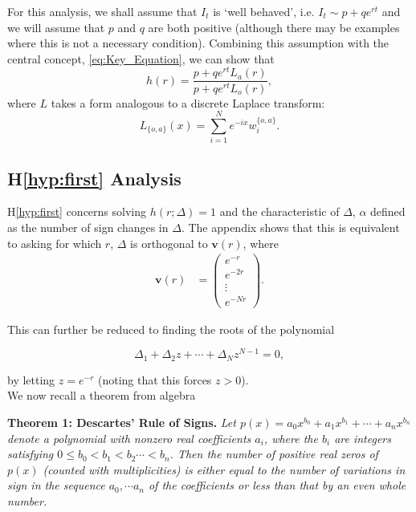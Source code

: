 \documentclass[10pt,journal,compsoc]{IEEEtran}
\begin{document}
For this analysis, we shall assume that $I_t$ is `well behaved', i.e. $I_t \sim p+qe^{rt}$ and we will assume that $p$ and $q$ are both positive (although there may be examples where this is not a necessary condition). Combining this assumption with the central concept, \ref{eq:Key_Equation}, we can show that
\begin{equation}\label{eq:Analysis_centre}
    h(r) = \frac{p+qe^{rt}L_a(r)}{p+qe^{rt}L_o(r)},
\end{equation}
where $L$ takes a form analogous to a discrete Laplace transform:
\begin{equation}
L_{\{o, a\}}(x) = \sum_{i=1}^{N}e^{-ix}w_i^{\{o, a\}}.
\end{equation}

\subsection{H\ref{hyp:first} Analysis}

H\ref{hyp:first} concerns solving $h(r; \Delta) = 1$ and the characteristic of $\Delta$, $\alpha$ defined as the number of sign changes in $\Delta$. The appendix shows that this is equivalent to asking for which $r$, $\Delta$ is orthogonal to $\boldsymbol{v}(r)$, where 
\begin{align*}
    \boldsymbol{v}(r) &= \begin{pmatrix}
           e^{-r} \\
           e^{-2r} \\
           \vdots \\
           e^{-Nr}
         \end{pmatrix}.
  \end{align*}

This can further be reduced to finding the roots of the polynomial

\begin{equation}\label{eq:Poly}
    \Delta_1 +\Delta_2 z + \cdots +\Delta_{N}z^{N-1} = 0,
\end{equation}

by letting $z = e^{-r}$ (noting that this forces $z>0$).\\

We now recall a theorem from algebra

\begin{mdframed}\label{Thm:1}
\textbf{Theorem 1: Descartes' Rule of Signs. }\textit{Let $p(x) = a_0x^{b_0} + a_1 x^{b_1}+ \cdots + a_nx^{b_n}$ denote a polynomial with nonzero real coefficients $a_i$, where the $b_i$ are integers satisfying $0\leq b_0 < b_1 < b_2 \cdots < b_n$. Then the number of positive real zeros of $p(x)$ (counted with multiplicities) is either equal to the number of variations in sign in the sequence $a_0, \cdots a_n$ of the coefficients or less than that by an even whole number.}
\end{mdframed}
\end{document}
